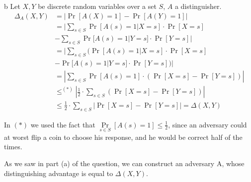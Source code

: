 \documentclass{article}
\begin{document}
\begin{paragraph}
	b Let $X, Y$ be discrete random variables over a set $S$, $A$ a distinguisher.
	\begin{align*}
		\Delta_A(X, Y) &= |\Pr[A(X) = 1] - \Pr[A(Y) = 1]|\\
		&=|\sum\limits_{s \in S}\Pr[A(s) = 1| X = s] \cdot \Pr[X = s]\\
		&- \sum\limits_{s \in S}\Pr[A(s) = 1| Y = s] \cdot \Pr[Y = s]|\\
		&=|\sum\limits_{s \in S}(\Pr[A(s) = 1 | X = s] \cdot \Pr[X = s]\\
		&- \Pr[A(s) = 1 | Y = s] \cdot \Pr[Y = s])|\\
		&=|\sum\limits_{s \in S}\Pr[A(s) = 1] \cdot \left(\Pr[X = s] - \Pr[Y = s]\right)|\\
		&\leq^{(*)} |\frac{1}{2} \cdot \sum\limits_{s \in S}(\Pr[X = s] - \Pr[Y = s])|\\
		&\leq \frac{1}{2} \cdot \sum\limits_{s \in S}|\Pr[X = s] - \Pr[Y = s]| = \Delta(X, Y)
	\end{align*}

	In $(*)$ we used the fact that $\Pr\limits_{s \in S}[A(s) = 1] \leq \frac{1}{2}$, since an adversary could at worst flip a coin to choose his response, and he would be correct half of the times.
	
	As we saw in part (a) of the question, we can construct an adversary A, whose distinguishing advantage is equal to $\Delta(X, Y)$.
\end{paragraph}
\end{document}
